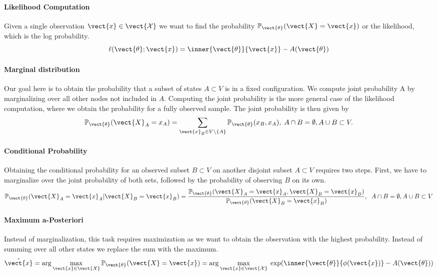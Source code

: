 \paragraph*{Likelihood Computation}
Given a single observation $\vect{x} \in \vect{\mathcal{X}}$ we want to find the probability  $\mathbb{P}_{\vect{\theta}}(\vect{X} = \vect{x})$ or the likelihood, which is the log probability.
\begin{equation}
    \ell(\vect{\theta}; \vect{x}) = \inner{\vect{\theta}}{\vect{x}} - A(\vect{\theta})
\end{equation}

\paragraph*{Marginal distribution}
Our goal here is to obtain the probability that a subset of states $A \subset V$ is in a fixed configuration.
We compute joint probability \wrt A by marginalizing over all other nodes not included in $A$. 
Computing the joint probability is the more general case of the likelihood computation, where we obtain the probability for a fully observed sample.
The joint probability is then given by
    \begin{equation}
        \mathbb{P}_{\vect{\theta}}(\vect{X}_A = x_A) = \sum_{\vect{x}_B \in V \setminus\{A\}} \mathbb{P}_{\vect{\theta}}(x_B , x_A), \; A \cap B = \emptyset, A \cup B \subset V.
    \end{equation}

\paragraph*{Conditional Probability}
Obtaining the conditional probability for an observed subset $B \subset V$ on another disjoint subset $A \subset V$ requires two steps. First, we have to marginalize over the joint probability of both sets, followed by the probability of observing $B$ on its own.
    \begin{equation}
        \mathbb{P}_{\vect{\theta}}(\vect{X}_A = \vect{x}_A \lvert \vect{X}_B = \vect{x}_B) = \frac{\mathbb{P}_{\vect{\theta}}(\vect{X}_A = \vect{x}_A , \vect{X}_B = \vect{x}_B)}{\mathbb{P}_{\vect{\theta}}(\vect{X}_B = \vect{x}_B)}, \;\; A \cap B = \emptyset, A \cup B \subset V
    \end{equation}

\paragraph*{Maximum a-Posteriori}
Instead of marginalization, this task requires maximization as we want to obtain the observation with the highest probability. 
Instead of summing over all other states we replace the sum with the maximum.
\begin{equation}
    \label{eq:map}
    \hat{\vect{x}} = \arg\max_{\vect{x} \in \vect{\mathcal{X}}} \mathbb{P}_{\vect{\theta}}(\vect{X} = \vect{x}) = \arg\max_{\vect{x} \in \vect{\mathcal{X}}} \; \exp(\inner{\vect{\theta}}{\phi(\vect{x})} - A(\vect{\theta}))
\end{equation}

